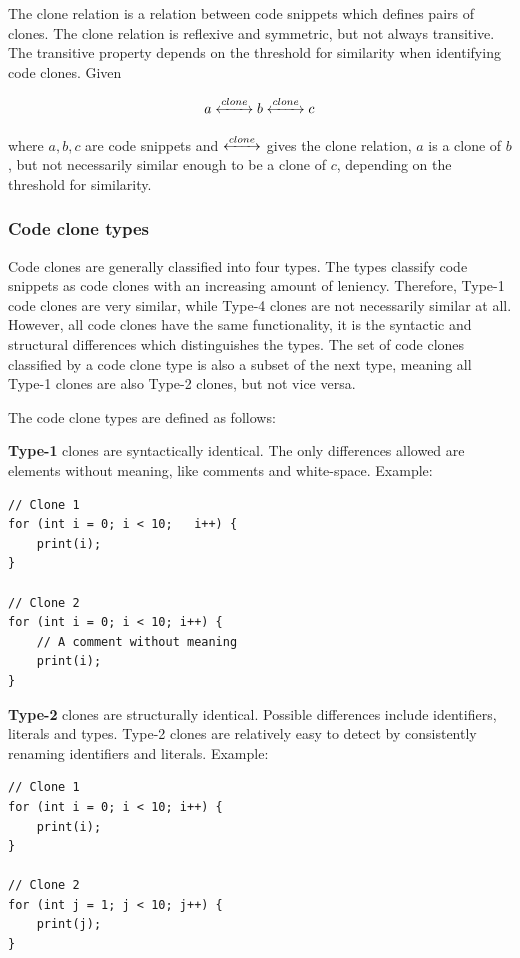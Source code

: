 \documentclass[12pt]{article}
\begin{document}
The clone relation is a relation between code snippets which defines pairs of clones.
The clone relation is reflexive and symmetric, but not always transitive. The transitive
property depends on the threshold for similarity when identifying code clones. Given

$$a \xleftrightarrow{clone} b \xleftrightarrow{clone} c$$


where $a,b,c$ are code snippets and $\xleftrightarrow{clone}$ gives the clone relation, $a$ is
a clone of $b$, but not necessarily similar enough to be a clone of $c$, depending on the
threshold for similarity.
\subsubsection{Code clone types}

Code clones are generally classified into four types\cite{Inoue_introduction_to_cc}. The
types classify code snippets as code clones with an increasing amount of leniency.
Therefore, Type-1 code clones are very similar, while Type-4 clones are not necessarily
similar at all. However, all code clones have the same functionality, it is the syntactic
and structural differences which distinguishes the types. The set of code clones
classified by a code clone type is also a subset of the next type, meaning all Type-1
clones are also Type-2 clones, but not vice versa.

The code clone types are defined as follows:

\textbf{Type-1} clones are syntactically identical. The only differences allowed are elements
without meaning, like comments and white-space. Example:

\begin{lstlisting}[frame=single]
// Clone 1
for (int i = 0; i < 10;   i++) {
    print(i);
}

// Clone 2
for (int i = 0; i < 10; i++) {
    // A comment without meaning
    print(i);
}

\end{lstlisting}

\textbf{Type-2} clones are structurally identical. Possible differences include
identifiers, literals and types. Type-2 clones are relatively easy to detect by
consistently renaming identifiers and literals.\cite[2]{Zibran_real_time_search} Example:

\begin{lstlisting}[frame=single]
// Clone 1
for (int i = 0; i < 10; i++) {
    print(i);
}

// Clone 2
for (int j = 1; j < 10; j++) {
    print(j);
}
\end{lstlisting}
\end{document}
